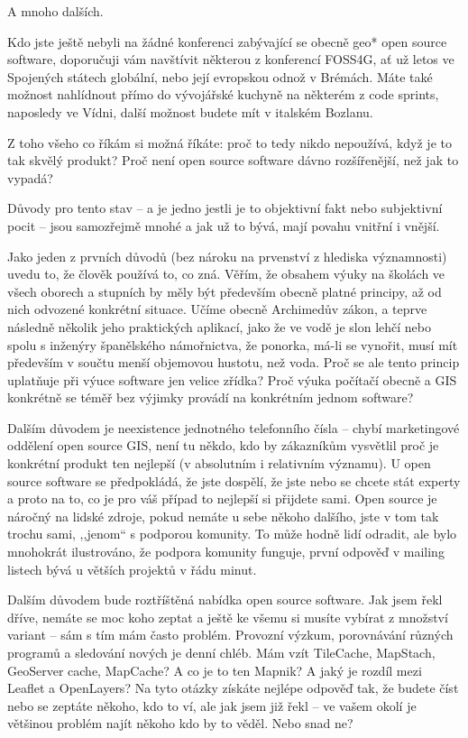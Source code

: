 \documentclass[twoside]{oss-conf}
\begin{document}
A mnoho dalších.

Kdo jste ještě nebyli na žádné konferenci zabývající se obecně geo* open source
software, doporučuji vám navštívit některou z konferencí FOSS4G, ať už letos ve
Spojených státech globální, nebo její evropskou odnož v Brémách. Máte také
možnost nahlídnout přímo do  vývojářské kuchyně na některém z code sprints,
naposledy ve Vídni, další možnost budete mít v italském Bozlanu. 

Z toho všeho co říkám si možná říkáte: proč to tedy nikdo nepoužívá, když je to
tak skvělý produkt? Proč není open source software dávno rozšířenější, než jak
to vypadá?

Důvody pro tento stav -- a je jedno jestli je to objektivní fakt nebo subjektivní
pocit -- jsou samozřejmě mnohé a jak už to bývá, mají povahu vnitřní i vnější.

Jako jeden z prvních důvodů (bez nároku na prvenství z hlediska významnosti)
uvedu to, že člověk používá to, co zná. Věřím, že obsahem výuky na
školách ve všech oborech a stupních by měly být především obecně platné
principy, až od nich odvozené konkrétní situace. Učíme obecně Archimedův zákon,
a teprve následně několik jeho praktických aplikací, jako že ve vodě je slon
lehčí nebo spolu s inženýry španělského námořnictva, že ponorka, má-li se vynořit,
musí mít především v součtu menší objemovou hustotu, než voda. Proč se ale tento
princip uplatňuje při výuce software jen velice zřídka? Proč výuka počítačí
obecně a GIS konkrétně se téměř bez výjimky provádí na konkrétním jednom
software?

Dalším důvodem je neexistence jednotného telefonního čísla -- chybí marketingové
oddělení open source GIS, není tu někdo, kdo by zákazníkům vysvětlil proč je
konkrétní produkt ten nejlepší (v absolutním i relativním významu). U open source
software se předpokládá, že jste dospělí, že jste nebo se chcete stát experty a
proto na to, co je pro váš případ to nejlepší si přijdete sami. Open source je
náročný na lidské zdroje, pokud nemáte u sebe někoho dalšího, jste v tom tak
trochu sami, ,,jenom`` s podporou komunity. To může hodně lidí odradit, ale
bylo mnohokrát  ilustrováno, že podpora komunity funguje, první odpověď v mailing
listech bývá u větších projektů v řádu minut.

Dalším důvodem bude roztříštěná nabídka open source software. Jak jsem řekl
dříve, nemáte se moc koho zeptat a ještě ke všemu si musíte vybírat z množství
variant -- sám s tím mám často problém. Provozní výzkum, porovnávání různých
programů a sledování nových je denní chléb. Mám vzít TileCache, MapStach,
GeoServer cache, MapCache? A co je to ten Mapnik? A jaký je rozdíl mezi Leaflet
a OpenLayers? Na tyto otázky získáte nejlépe odpověď tak, že budete číst nebo se
zeptáte někoho, kdo to ví, ale jak jsem již řekl -- ve vašem okolí je většinou
problém najít někoho kdo by to věděl. Nebo snad ne?
\end{document}
